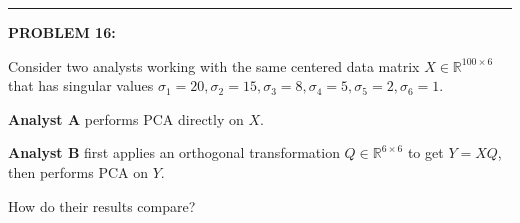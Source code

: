 \documentclass[12pt]{amsart}
\newcommand{\divider}{
  \vspace{-1em} %
  \noindent
  \raisebox{-0.15ex}{\textbullet}%
  \hspace{0.5em}%
  \rule[0.5ex]{0.95\textwidth}{1.0pt}%
  \hspace{0.5em}%
  \raisebox{-0.15ex}{\textbullet}%
  \vspace{0em} %
}
\begin{document}
% 
% 
% 

\divider


\newpage



{\bf PROBLEM 16:}

Consider two analysts working with the same centered data matrix $X \in \mathbb{R}^{100 \times 6}$ that has singular values $\sigma_1 = 20, \sigma_2 = 15, \sigma_3 = 8, \sigma_4 = 5, \sigma_5 = 2, \sigma_6 = 1$.

\textbf{Analyst A} performs PCA directly on $X$.

\textbf{Analyst B} first applies an orthogonal transformation $Q \in \mathbb{R}^{6 \times 6}$ to get $Y = XQ$, then performs PCA on $Y$.

How do their results compare?
\end{document}

